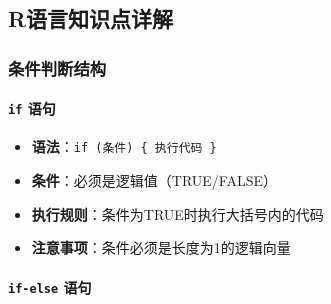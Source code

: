 \documentclass[
  twoside]{book}
\newenvironment{Shaded}{\begin{snugshade}}{\end{snugshade}}
\newcommand{\CommentTok}[1]{\textcolor[rgb]{0.56,0.35,0.01}{\textit{#1}}}
\newcommand{\FunctionTok}[1]{\textcolor[rgb]{0.13,0.29,0.53}{\textbf{#1}}}
\newcommand{\NormalTok}[1]{#1}
\newcommand{\OtherTok}[1]{\textcolor[rgb]{0.56,0.35,0.01}{#1}}
\newcommand{\SpecialCharTok}[1]{\textcolor[rgb]{0.81,0.36,0.00}{\textbf{#1}}}
\newcommand{\StringTok}[1]{\textcolor[rgb]{0.31,0.60,0.02}{#1}}
\providecommand{\tightlist}{%
  \setlength{\itemsep}{0pt}\setlength{\parskip}{0pt}}
\begin{document}
\begin{Shaded}
\end{Shaded}

\hypertarget{rux8bedux8a00ux77e5ux8bc6ux70b9ux8be6ux89e3-7}{%
\subsection{R语言知识点详解}\label{rux8bedux8a00ux77e5ux8bc6ux70b9ux8be6ux89e3-7}}

\hypertarget{ux6761ux4ef6ux5224ux65adux7ed3ux6784}{%
\subsubsection{条件判断结构}\label{ux6761ux4ef6ux5224ux65adux7ed3ux6784}}

\hypertarget{if-ux8bedux53e5}{%
\paragraph{\texorpdfstring{\texttt{if} 语句}{if 语句}}\label{if-ux8bedux53e5}}

\begin{itemize}
\tightlist
\item
  \textbf{语法}：\texttt{if\ (条件)\ \{\ 执行代码\ \}}
\item
  \textbf{条件}：必须是逻辑值（TRUE/FALSE）
\item
  \textbf{执行规则}：条件为TRUE时执行大括号内的代码
\item
  \textbf{注意事项}：条件必须是长度为1的逻辑向量
\end{itemize}

\hypertarget{if-else-ux8bedux53e5}{%
\paragraph{\texorpdfstring{\texttt{if-else} 语句}{if-else 语句}}\label{if-else-ux8bedux53e5}}
\end{document}
